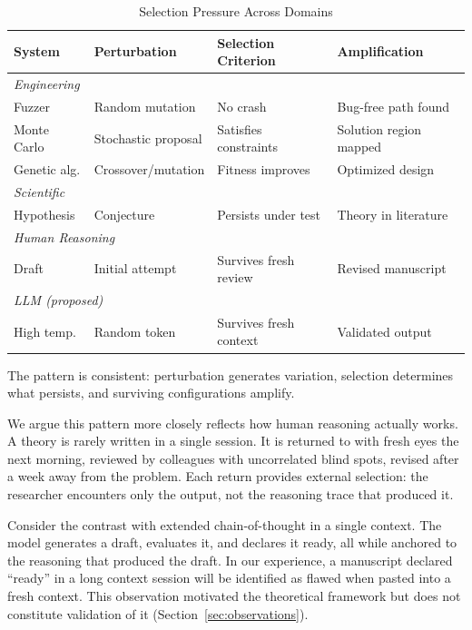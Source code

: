 \documentclass[11pt]{article}
\begin{document}
\begin{table}[ht]
\centering
\caption{Selection Pressure Across Domains}
\small
\begin{tabular}{llll}
\toprule
\textbf{System} & \textbf{Perturbation} & \textbf{Selection Criterion} & \textbf{Amplification} \\
\midrule
\multicolumn{4}{l}{\textit{Engineering}} \\
Fuzzer & Random mutation & No crash & Bug-free path found \\
Monte Carlo & Stochastic proposal & Satisfies constraints & Solution region mapped \\
Genetic alg. & Crossover/mutation & Fitness improves & Optimized design \\
\midrule
\multicolumn{4}{l}{\textit{Scientific}} \\
Hypothesis & Conjecture & Persists under test & Theory in literature \\
\midrule
\multicolumn{4}{l}{\textit{Human Reasoning}} \\
Draft & Initial attempt & Survives fresh review & Revised manuscript \\
\midrule
\multicolumn{4}{l}{\textit{LLM (proposed)}} \\
High temp. & Random token & Survives fresh context & Validated output \\
\bottomrule
\end{tabular}
\end{table}

The pattern is consistent: perturbation generates variation, selection determines what
persists, and surviving configurations amplify.

We argue this pattern more closely reflects how human reasoning actually works. A theory is
rarely written in a single session. It is returned to with fresh eyes the next morning,
reviewed by colleagues with uncorrelated blind spots, revised after a week away from the
problem. Each return provides external selection: the researcher encounters only the output,
not the reasoning trace that produced it.

Consider the contrast with extended chain-of-thought in a single context. The model
generates a draft, evaluates it, and declares it ready, all while anchored to the reasoning
that produced the draft. In our experience, a manuscript declared ``ready'' in a long context
session will be identified as flawed when pasted into a fresh context. This observation
motivated the theoretical framework but does not constitute validation of it
(Section~\ref{sec:observations}).
\end{document}

